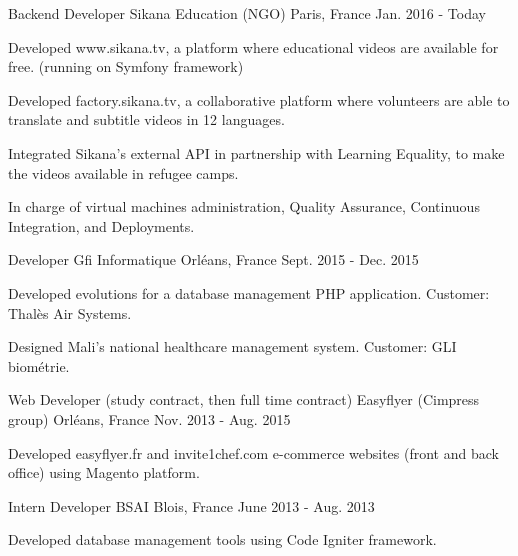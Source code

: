 \begin{cventries}
  \cventry
    {Backend Developer}
    {Sikana Education (NGO)}
    {Paris, France}
    {Jan. 2016 - Today}
    {
      \begin{cvitems}
        \item {Developed www.sikana.tv, a platform where educational videos are available for free. (running on Symfony framework)}
        \item {Developed factory.sikana.tv, a collaborative platform where volunteers are able to translate and subtitle videos in 12 languages.}
        \item {Integrated Sikana's external API in partnership with Learning Equality, to make the videos available in refugee camps.}
        \item {In charge of virtual machines administration, Quality Assurance, Continuous Integration, and Deployments.}
      \end{cvitems}
    }
  \cventry
    {Developer}
    {Gfi Informatique}
    {Orléans, France}
    {Sept. 2015 - Dec. 2015}
    {
      \begin{cvitems}
        \item {Developed evolutions for a database management PHP application. Customer: Thalès Air Systems.}
        \item {Designed Mali's national healthcare management system. Customer: GLI biométrie.}
      \end{cvitems}
    }
  \cventry
    {Web Developer (study contract, then full time contract)}
    {Easyflyer (Cimpress group)}
    {Orléans, France}
    {Nov. 2013 - Aug. 2015}
    {
      \begin{cvitems}
        \item {Developed easyflyer.fr and invite1chef.com e-commerce websites (front and back office) using Magento platform.}
      \end{cvitems}
    }
  \cventry
    {Intern Developer}
    {BSAI}
    {Blois, France}
    {June 2013 - Aug. 2013}
    {
      \begin{cvitems}
        \item {Developed database management tools using Code Igniter framework.}
      \end{cvitems}
    }
\end{cventries}
